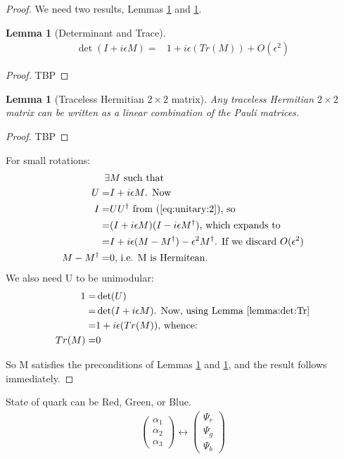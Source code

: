 \documentclass[]{article}
\newtheorem{lemma}[thm]{Lemma}
\begin{document}
\begin{proof}
	We need two results, Lemmas \ref{lemma:det:Tr} and \ref{lemma:traceless:22}.
	\begin{lemma}[Determinant and Trace]\label{lemma:det:Tr}
		\begin{align*}
		\det( I + i \epsilon M) =& 1 + i\epsilon(Tr(M)) + O(\epsilon^2)
		\end{align*}
	\end{lemma}
	\begin{proof}
		TBP
	\end{proof}
	\begin{lemma}[Traceless Hermitian $2\times2$ matrix]\label{lemma:traceless:22}
		Any traceless Hermitian $2\times2$ matrix can be written as a linear combination of the Pauli  matrices.
	\end{lemma}
	\begin{proof}
		TBP
	\end{proof}

	For small rotations:
	\begin{align*}
	\exists& M \text{ such that}\\
	U =& I + i \epsilon M \text{. Now}\\
	I =&U U^\dagger \text{ from (\ref{eq:unitary:2}), so}\\
	=& (I + i \epsilon M)(I - i\epsilon M^\dagger) \text{, which expands to}\\
	=& I + i \epsilon(M - M^\dagger) - \epsilon^2 M^\dagger \text{. If we discard $O(\epsilon^2)$}\\
	M - M^\dagger =& 0 \text{, i.e. M is Hermitean.}
	\end{align*}
	We also need U to be unimodular:
	\begin{align*}
	1=&\det(U)\\
	=& \det( I + i \epsilon M) \text{. Now, using Lemma \ref{lemma:det:Tr}}\\
	=& 1 + i\epsilon(Tr(M)) \text{, whence:}\\
	Tr(M) =&0
	\end{align*}
	
	So M satisfies the preconditions of Lemmas \ref{lemma:det:Tr} and \ref{lemma:traceless:22}, and the result follows immediately.
	
\end{proof}

State of quark can be Red, Green, or Blue. 
\begin{align*}
	\begin{pmatrix}
		\alpha_1\\
		\alpha_2\\
		\alpha_3
	\end{pmatrix} \leftrightarrow	\begin{pmatrix}
	\Psi_r\\
	\Psi_g\\
	\Psi_b
	\end{pmatrix}
\end{align*}
\end{document}
